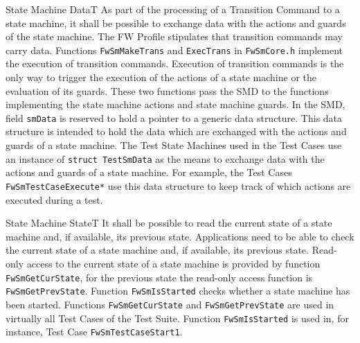 \documentclass[requirements]{../fwprofile}
\begin{document}
\begin{fw_req}{State Machine Data}{T}
{As part of the processing of a Transition Command to a state 
machine, it shall be possible to exchange data with the actions and guards of the 
state machine.}
{The FW Profile stipulates that transition commands may carry data.}
{Functions \texttt{FwSmMakeTrans} and \texttt{ExecTrans} 
in \texttt{FwSmCore.h} implement the execution of transition commands.
Execution of transition commands is the only way to trigger the execution of the actions 
of a state machine or the evaluation of its guards. 
These two functions pass the SMD to the functions implementing the state machine actions 
and state machine guards. 
In the SMD, field \texttt{smData} is reserved to hold a pointer to a generic data structure. 
This data structure is intended to hold the data which are exchanged with the actions 
and guards of a state machine.} 
{The Test State Machines used in the Test Cases use an instance 
of \texttt{struct TestSmData} as the means to exchange data with the actions and guards 
of a state machine. 
For example, the Test Cases \texttt{FwSmTestCaseExecute*} use this data structure to keep 
track of which actions are executed during a test.}
\end{fw_req}


\begin{fw_req}{State Machine State}{T}
{It shall be possible to read the current state of a state machine and, if available, its previous state.}
{Applications need to be able to check the current state of a state machine and, if available, its previous state.}
{Read-only access to the current state of a state machine is provided by function \texttt{FwSmGetCurState}, for the previous state the read-only access function is \texttt{FwSmGetPrevState}. 
Function \texttt{FwSmIsStarted} checks whether a state machine has been started.} 
{Functions \texttt{FwSmGetCurState} and \texttt{FwSmGetPrevState} are used in virtually all
Test Cases of the Test Suite. 
Function \texttt{FwSmIsStarted} is used in, for instance, Test Case 
\texttt{FwSmTestCaseStart1}.}
\end{fw_req}
\end{document}
